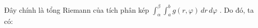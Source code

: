 \documentclass[preview]{standalone}
\begin{document}
\begin{center}
Đây chính là tổng Riemann của tích phân kép $\int_{\alpha}^{\beta} \int_{a}^{b} g(r, \varphi)\, dr\, d\varphi$ . Do đó, ta có:
\end{center}
\end{document}

